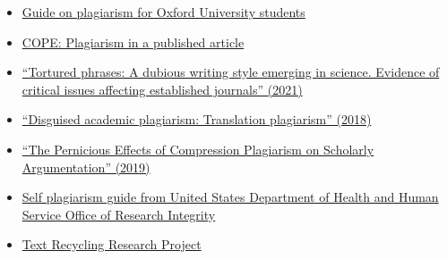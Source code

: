 \documentclass[letterpaper, 12pt]{article}
\begin{document}
\begin{itemize}
    \setlength\itemsep{-0.5em}
    \item \href{https://www.ox.ac.uk/students/academic/guidance/skills/plagiarism}{Guide on plagiarism for Oxford University students}
    \item \href{https://doi.org/10.24318/cope.2019.2.2}{COPE: Plagiarism in a published article}
    \item \href{https://doi.org/10.48550/arXiv.2107.06751}{``Tortured phrases: A dubious writing style emerging in science. Evidence of critical issues affecting established journals'' (2021)}
    \item \href{https://doi.org/10.1007/978-3-030-46711-1_2}{``Disguised academic plagiarism: Translation plagiarism'' (2018)}
    \item \href{https://doi.org/10.1007/s10503-019-09481-3}{``The Pernicious Effects of Compression Plagiarism on Scholarly Argumentation'' (2019)}
    \item \href{https://ori.hhs.gov/self-plagiarism}{Self plagiarism guide from United States Department of Health and Human Service Office of Research Integrity}
    \item \href{https://textrecycling.org/}{Text Recycling Research Project}
\end{itemize}
\end{document}
